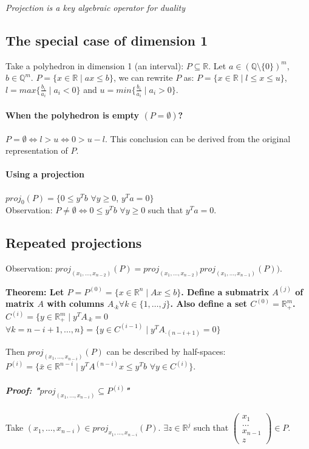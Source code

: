 \documentclass[main]{subfiles}
\begin{document}
\emph{Projection is a key algebraic operator for duality}

\subsection{The special case of dimension 1}
Take a polyhedron in dimension 1 (an interval): $P \subseteq \mathbb{R}$.
Let $a \in (\mathbb{Q}\setminus \{0\})^m$, $b \in \mathbb{Q}^m$. $P = \{ x \in
\mathbb{R} \mid ax \leq b \}$, we can rewrite $P$ as: $P = \{ x \in \mathbb{R}
\mid l \leq x \leq u \}$, $l = max \{ \frac{b_i}{a_i} \mid a_i < 0 \}$ and $u =
min \{ \frac{b_i}{a_i} \mid a_i > 0 \}$.

\paragraph{When the polyhedron is empty $(P = \emptyset)$?}
$P = \emptyset \iff l > u \iff 0 > u-l$. This conclusion can be derived from
the original representation of $P$.

\paragraph{Using a projection}
$proj_{0}(P) = \{ 0 \leq y^T b$ $\forall y \geq 0$, $y^T a = 0 \}$ \\
Observation: $P \neq \emptyset \iff 0 \leq y^T b$ $\forall y \geq 0$ such that
$y^T a = 0$.

\subsection{Repeated projections}
Observation: $proj_{(x_1, \dots, x_{n-2})}(P) = proj_{(x_1, \dots, x_{n-2})}
proj_{(x_1, \dots, x_{n-1})}(P))$.

\textbf{Theorem: Let $P = P^{(0)} = \{ x \in \mathbb{R}^n \mid Ax \leq b \}$.
Define a submatrix $A^{(j)}$ of matrix $A$ with columns $A_{\cdot k} \forall k
\in \{1, \dots, j\}$. Also define a set $C^{(0)} = \mathbb{R}_+^m$. $C^{(i)} =
\{ y \in \mathbb{R}_+^m \mid y^T A_{\cdot k} = 0$ $\forall k = n-i+1, \dots, n
\} = \{y \in C^{(i-1)} \mid y^T A_{\cdot (n-i+1)} = 0\}$ }

Then $proj_{(x_1, \dots, x_{n-i})}(P)$ can be described by half-spaces:
$P^{(i)} = \{ \bar{x} \in \mathbb{R}^{n-i} \mid y^T A^{(n-i)}x \leq y^T b$
$\forall y \in C^{(i)} \}$.

\subparagraph{Proof: "$proj_{(x_1, \dots, x_{n-i})} \subseteq P^{(i)}$"}
Take $(x_1, \dots, x_{n-i}) \in proj_{x_1, \dots, x_{n-i}}(P).$ $\exists z \in
\mathbb{R}^j$ such that
$\begin{pmatrix}
	x_1 \\
    \dots \\
    x_{n-1} \\
    z
\end{pmatrix} \in P$.
\end{document}
